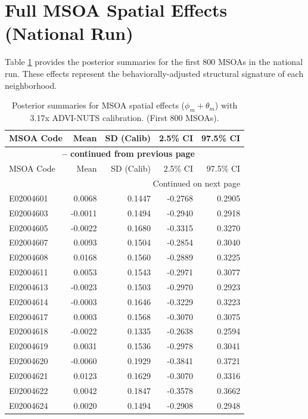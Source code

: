 \documentclass[11pt, a4paper]{article}
\begin{document}
\newpage
\section{Full MSOA Spatial Effects (National Run)}

Table \ref{tab:supp_post_phi} provides the posterior summaries for the first 
800 MSOAs in the national run. These effects represent the 
behaviorally-adjusted structural signature of each neighborhood.

\begin{longtable}{lrrrr}
\caption{Posterior summaries for MSOA spatial effects ($\phi_m + \theta_m$) with 3.17x ADVI-NUTS calibration. (First 800 MSOAs).} \label{tab:supp_post_phi} \\
\toprule
MSOA Code & Mean & SD (Calib) & 2.5\% CI & 97.5\% CI \\
\midrule
\endfirsthead
\multicolumn{5}{c}{{\bfseries \tablename\ \thetable{} -- continued from previous page}} \\
\toprule
MSOA Code & Mean & SD (Calib) & 2.5\% CI & 97.5\% CI \\
\midrule
\endhead
\midrule
\multicolumn{5}{r}{{Continued on next page}} \\
\endfoot
\bottomrule
\endlastfoot
E02004601 & 0.0068 & 0.1447 & -0.2768 & 0.2905 \\
E02004603 & -0.0011 & 0.1494 & -0.2940 & 0.2918 \\
E02004605 & -0.0022 & 0.1680 & -0.3315 & 0.3270 \\
E02004607 & 0.0093 & 0.1504 & -0.2854 & 0.3040 \\
E02004608 & 0.0168 & 0.1560 & -0.2889 & 0.3225 \\
E02004611 & 0.0053 & 0.1543 & -0.2971 & 0.3077 \\
E02004613 & -0.0023 & 0.1503 & -0.2970 & 0.2923 \\
E02004614 & -0.0003 & 0.1646 & -0.3229 & 0.3223 \\
E02004617 & 0.0003 & 0.1568 & -0.3070 & 0.3075 \\
E02004618 & -0.0022 & 0.1335 & -0.2638 & 0.2594 \\
E02004619 & 0.0031 & 0.1536 & -0.2978 & 0.3041 \\
E02004620 & -0.0060 & 0.1929 & -0.3841 & 0.3721 \\
E02004621 & 0.0123 & 0.1629 & -0.3070 & 0.3316 \\
E02004622 & 0.0042 & 0.1847 & -0.3578 & 0.3662 \\
E02004624 & 0.0020 & 0.1494 & -0.2908 & 0.2948 \\

\end{longtable}
\end{document}
